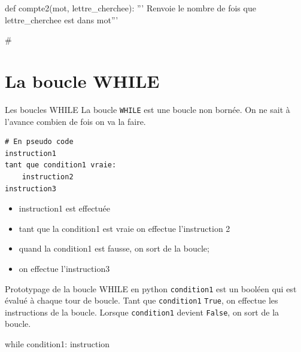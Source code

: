 \begin{exercice_cours}{}	
	
			\begin{CodePythontexAlt}[Lignes=false, Largeur=1\linewidth,Centre,PremLigne=1, Lignes=false,]{}
				def compte2(mot, lettre_cherchee):
					''' Renvoie le nombre de fois que lettre_cherchee est dans mot'''
					
	
	

					
	
	
	
	
	
				#
				\end{CodePythontexAlt}
		\end{exercice_cours}
		
		\newpage
			\renewcommand{\arraystretch}{1}
		\section{La boucle WHILE}

		\begin{easybox}{Les boucles WHILE}
		La boucle \verb+WHILE+ est une boucle non bornée. On ne sait à l'avance combien de fois on va la faire.
	
		\medskip
	\begin{minipage}{0.4\linewidth}
	\begin{lstlisting}[numbers=none]
# En pseudo code
instruction1
tant que condition1 vraie:
	instruction2
instruction3
	\end{lstlisting}
		\end{minipage}\hfill
		\begin{minipage}{0.59\linewidth}
	\begin{itemize}
		\item instruction1 est effectuée
		\item tant que la condition1 est vraie on effectue l'instruction 2
		\item quand la condition1 est fausse, on sort de la boucle;
		\item on effectue l'instruction3
	\end{itemize}
		\end{minipage}	
	\end{easybox}
	

		\begin{easybox}{Prototypage de la boucle WHILE en python}
	\verb|condition1| est un booléen qui est évalué à chaque tour de boucle.  Tant que \verb|condition1| \verb|True|, on effectue les instructions de la boucle. Lorsque \verb|condition1| devient \verb|False|, on sort de la boucle.

	\begin{center}
	
	\begin{CodePythontexAlt}[Largeur=1\linewidth,Centre,PremLigne=1, Lignes=false,]{}
		while condition1:
			instruction
	\end{CodePythontexAlt}
	\end{center}
	

			\end{easybox}

